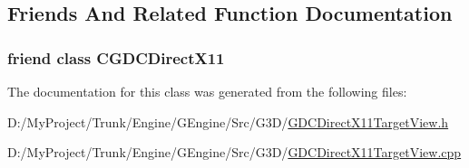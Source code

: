 \subsection{Friends And Related Function Documentation}
\hypertarget{class_c_g_d_c_direct_x11_target_view_a4bc7a261a74cf14c4f43ce9c65b1f0b4}{}
\subsubsection[{C\+G\+D\+C\+Direct\+X11}]{\setlength{\rightskip}{0pt plus 5cm}friend class {\bf C\+G\+D\+C\+Direct\+X11}\hspace{0.3cm}{\ttfamily [friend]}}\label{class_c_g_d_c_direct_x11_target_view_a4bc7a261a74cf14c4f43ce9c65b1f0b4}


The documentation for this class was generated from the following files\+:\begin{DoxyCompactItemize}
\item 
D\+:/\+My\+Project/\+Trunk/\+Engine/\+G\+Engine/\+Src/\+G3\+D/\hyperlink{_g_d_c_direct_x11_target_view_8h}{G\+D\+C\+Direct\+X11\+Target\+View.\+h}\item 
D\+:/\+My\+Project/\+Trunk/\+Engine/\+G\+Engine/\+Src/\+G3\+D/\hyperlink{_g_d_c_direct_x11_target_view_8cpp}{G\+D\+C\+Direct\+X11\+Target\+View.\+cpp}\end{DoxyCompactItemize}
